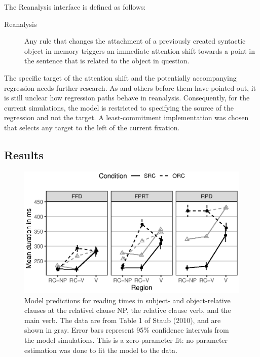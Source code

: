 \documentclass{cambridge7A}\usepackage[]{graphicx}\usepackage[]{color}
\makeatletter
\def\maxwidth{ %
  \ifdim\Gin@nat@width>\linewidth
    \linewidth
  \else
    \Gin@nat@width
  \fi
}
\newenvironment{knitrout}{}{} %
\makeatother
\begin{document}
The Reanalysis interface is defined as follows:
\begin{description}
  \item[Reanalysis] Any rule that changes the attachment of a previously created syntactic object in memory triggers an immediate attention shift towards a point in the sentence that is related to the object in question. 
\end{description}
%
The specific target of the attention shift and the potentially accompanying regression needs further research. As \cite{MalsburgVasishth2011,MalsburgEtAl2015} and others before them \citep{MeseguerCarreirasClifton2002,greenmitchellJML06} have pointed out, it is still unclear how regression paths behave in reanalysis.
Consequently, for the current simulations, the model is restricted to specifying the source of the regression and not the target. A least-commitment implementation was chosen that selects any target to the left of the current fixation.

\subsection{Results}

\begin{figure}[tb]
  \centering
\begin{knitrout}
\color{fgcolor}

{\centering \includegraphics[width=\maxwidth]{figures/fig-staub10modelRT-1} 

}



\end{knitrout}
\caption[Model predictions for reading times in subject- and object-relative clauses.]{Model predictions for reading times in subject- and object-relative clauses at the relativel clause NP, the relative clause verb, and the  main verb. The data are from Table 1 of Staub (2010), and are shown in gray. Error bars represent 95\% confidence intervals from the model simulations. This is a zero-parameter fit: no parameter estimation was done to fit the model to the data.} \label{fig:staubmodel:rt}
\end{figure}
\end{document}
